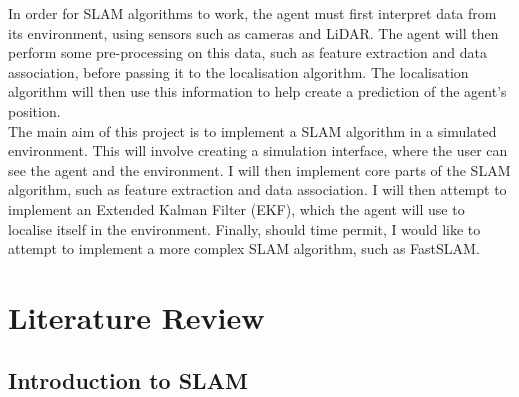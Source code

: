 \documentclass[12pt]{article}
\begin{document}
In order for SLAM algorithms to work, the agent must first interpret data from its environment, using sensors such as cameras and LiDAR.
The agent will then perform some pre-processing on this data, such as feature extraction and data association, before passing it to the
localisation algorithm. The localisation algorithm will then use this information to help create a prediction of the agent's position.\\

The main aim of this project is to implement a SLAM algorithm in a simulated environment. This will involve creating a simulation
interface, where the user can see the agent and the environment. I will then implement core parts of the SLAM algorithm, such as
feature extraction and data association. I will then attempt to implement an Extended Kalman Filter (EKF), which the agent will use
to localise itself in the environment. Finally, should time permit, I would like to attempt to implement a more complex SLAM algorithm,
such as FastSLAM.\\


\section{Literature Review} %

\subsection{Introduction to SLAM} %
\end{document}

